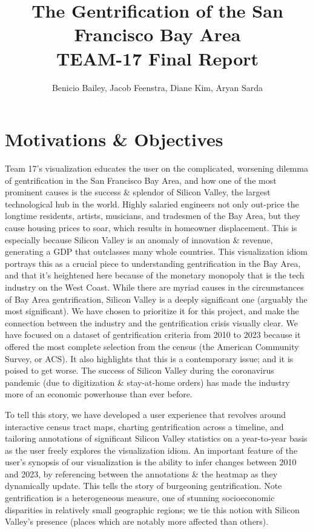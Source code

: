 \documentclass{article}
\title{The Gentrification of the San Francisco Bay Area \\ \large TEAM-17 Final Report}
\author{Benicio Bailey, Jacob Feenstra, Diane Kim, Aryan Sarda}
\begin{document}
\maketitle

\section{Motivations \& Objectives}

    Team 17's visualization educates the user on the complicated, worsening dilemma of gentrification in the San Francisco Bay Area, and how one of the most prominent causes is the success \& splendor of Silicon Valley, the largest technological hub in the world. Highly salaried engineers not only out-price the longtime residents, artists, musicians, and tradesmen of the Bay Area, but they cause housing prices to soar, which results in homeowner displacement. This is especially because Silicon Valley is an anomaly of innovation \& revenue, generating a GDP that outclasses many whole countries. This visualization idiom portrays this as a crucial piece to understanding gentrification in the Bay Area, and that it's heightened here because of the monetary monopoly that is the tech industry on the West Coast. While there are myriad causes in the circumstances of Bay Area gentrification, Silicon Valley is a deeply significant one (arguably the most significant). We have chosen to prioritize it for this project, and make the connection between the industry and the gentrification crisis visually clear. We have focused on a dataset of gentrification criteria from 2010 to 2023 because it offered the most complete selection from the census (the American Community Survey, or ACS). It also highlights that this is a contemporary issue; and it is poised to get worse. The success of Silicon Valley during the coronavirus pandemic (due to digitization \& stay-at-home orders) has made the industry more of an economic powerhouse than ever before.
    
    To tell this story, we have developed a user experience that revolves around interactive census tract maps, charting gentrification across a timeline, and tailoring annotations of significant Silicon Valley statistics on a year-to-year basis as the user freely explores the visualization idiom. An important feature of the user's synopsis of our visualization is the ability to infer changes between 2010 and 2023, by referencing between the annotations \& the heatmap as they dynamically update. This tells the story of burgeoning gentrification. Note gentrification is a heterogeneous measure, one of stunning socioeconomic disparities in relatively small geographic regions; we tie this notion with Silicon Valley's presence (places which are notably more affected than others).
    
\end{document}
